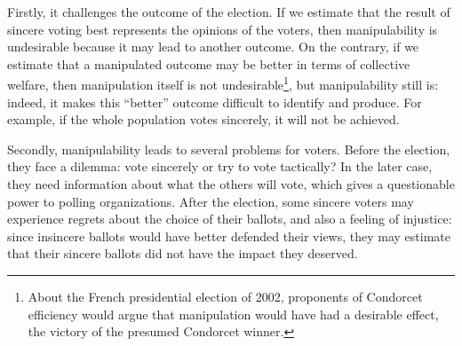 
Firstly, it challenges the outcome of the election. If we estimate that the result of sincere voting best represents the opinions of the voters, then manipulability is undesirable because it may lead to another outcome. On the contrary, if we estimate that a manipulated outcome may be better in terms of collective welfare, then manipulation itself is not undesirable\footnote{About the French presidential election of 2002, proponents of Condorcet efficiency would argue that manipulation would have had a desirable effect, the victory of the presumed Condorcet winner.}, but manipulability still is: indeed, it makes this ``better'' outcome difficult to identify and produce. For example, if the whole population votes sincerely, it will not be achieved.

Secondly, manipulability leads to several problems for voters. Before the election, they face a dilemma: vote sincerely or try to vote tactically? In the later case, they need information about what the others will vote, which gives a questionable power to polling organizations. After the election, some sincere voters may experience regrets about the choice of their ballots, and also a feeling of injustice: since insincere ballots would have better defended their views, they may estimate that their sincere ballots did not have the impact they deserved.



